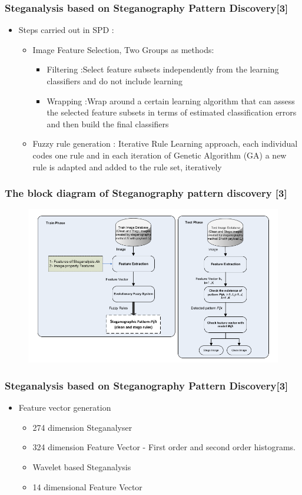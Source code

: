 \documentclass{beamer} %
\theoremstyle{definition} %
\begin{document}
\begin{frame}
\frametitle{Steganalysis based on Steganography Pattern Discovery[3]  }
\begin{itemize}
	\item Steps carried out in SPD : 
	\begin{itemize}
		\item Image Feature Selection, Two Groups as methods: 
		\begin{itemize}
			\item Filtering :Select feature subsets independently from the learning classifiers and do not include learning 
			\item Wrapping :Wrap around a certain learning algorithm that can
			assess the selected feature subsets in terms of estimated classification errors and then build the final classifiers  
		\end{itemize}
		\item Fuzzy rule generation : Iterative Rule Learning approach, each individual codes one rule and in each iteration of Genetic Algorithm (GA) a new rule is adapted and added to the rule set, iteratively  
	\end{itemize} 
\end{itemize}
\end{frame}

\begin{frame}
\frametitle{The block diagram of Steganography pattern discovery [3]  }
\begin{figure}
\includegraphics[scale=0.37]{spdBlockDiag.png}
\end{figure}
\end{frame}

\begin{frame}
\frametitle{Steganalysis based on Steganography Pattern Discovery[3]}
\begin{itemize}
	\item Feature vector generation
	\begin{itemize}
	\item 274 dimension Steganalyser 
	\item 324 dimension Feature Vector - First order and second order histograms.
	\item Wavelet based Steganalysis 
	\item 14 dimensional Feature Vector 
	\end{itemize}
\end{itemize}
\end{frame}
\end{document}
